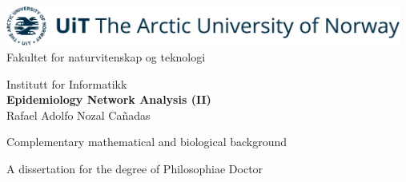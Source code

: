 \documentclass[12pt,twoside,a4paper,fleqn, english]{report}
\begin{document}
\pagestyle{empty}
\begin{center}
    \parbox[c][\textheight][t]{\textwidth}{
    
        \vspace{-2cm}
        \begin{left}

            \includegraphics[width=13cm]{figures/Others/UiT_Logo_Eng_Bla_RGB.png}\\

            \setlength{\parindent}{4em}                 %
            \vspace{0.6cm}
            \large Fakultet for naturvitenskap og teknologi \par
            \large Institutt for Informatikk \\

            \vspace{0.15cm}
            \Large \textbf{Epidemiology Network Analysis (II)}\\

            \vspace{0.05cm}
            \normalsize Rafael Adolfo Nozal Cañadas \par  
            \normalsize Complementary mathematical and biological background
            
            A dissertation for the degree of Philosophiae Doctor  \\ \rightline{\today}
            

\end{left}}
\end{center}
\end{document}
